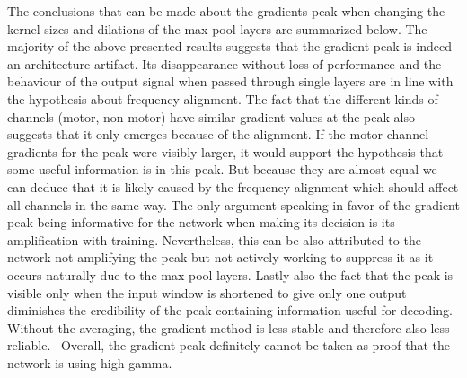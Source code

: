 The conclusions that can be made about the gradients peak when changing the kernel sizes and dilations of the max-pool layers are summarized below.
The majority of the above presented results suggests that the gradient peak is indeed an architecture artifact.
Its disappearance without loss of performance and the behaviour of the output signal when passed through single layers are in line with the hypothesis about frequency alignment.
The fact that the different kinds of channels (motor, non-motor) have similar gradient values at the peak also suggests that it only emerges because of the alignment.
If the motor channel gradients for the peak were visibly larger, it would support the hypothesis that some useful information is in this peak.
But because they are almost equal we can deduce that it is likely caused by the frequency alignment which should affect all channels in the same way.
The only argument speaking in favor of the gradient peak being informative for the network when making its decision is its amplification with training.
Nevertheless, this can be also attributed to the network not amplifying the peak but not actively working to suppress it as it occurs naturally due to the max-pool layers.
Lastly also the fact that the peak is visible only when the input window is shortened to give only one output diminishes the credibility of the peak containing information useful for decoding.
Without the averaging, the gradient method is less stable and therefore also less reliable.~
Overall, the gradient peak definitely cannot be taken as proof that the network is using high-gamma.
